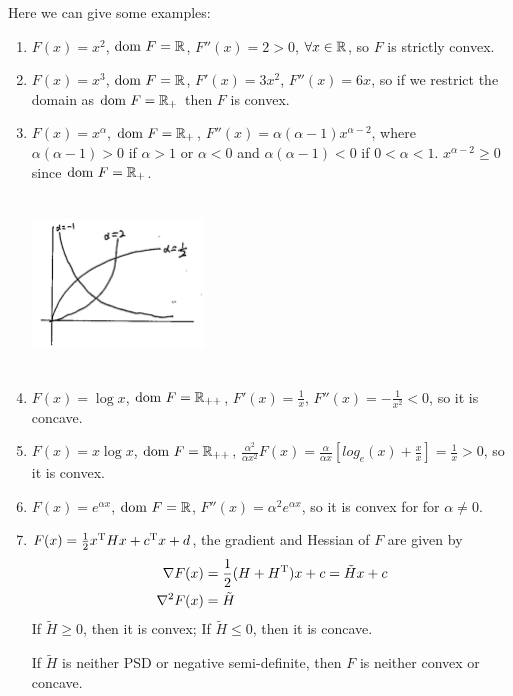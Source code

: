 Here we can give some examples:

\begin{enumerate}
	\item $F(x) = x^2$, $\text{dom}\ F = \mathbb{R}$, $F''(x) = 2 > 0$, $\forall x\in \mathbb{R}$, so $F$ is strictly convex.
	
	\item $F(x) = x^3$, $\text{dom}\ F = \mathbb{R}$, $F'(x) = 3x^2$, $F''(x) = 6x$, so if we restrict the domain as $\text{dom}\ F = \mathbb{R}_+$ then $F$ is convex.
	
	\item $F(x) = x^{\alpha}$, $\text{dom}\ F = \mathbb{R}_+$, $F''(x) = \alpha(\alpha - 1)x^{\alpha - 2}$, where $\alpha(\alpha - 1) > 0$ if $\alpha > 1$ or $\alpha < 0$ and $\alpha(\alpha - 1) < 0$ if $0<\alpha < 1$. $x^{\alpha - 2}\geq 0$ since $\text{dom}\ F = \mathbb{R}_+$.
	
	\begin{marginfigure}
	\centering
	\includegraphics[width=1.8in,height=1.8in]{figures/ch08/figure1106_4.png}
	\end{marginfigure}
	
	\item $F(x) = \log x$, $\text{dom}\ F = \mathbb{R}_{++}$, $F'(x) = \frac{1}{x}$, $F''(x) = -\frac{1}{x^2}<0$, so it is concave.
	
	\item $F(x) = x\log x$, $\text{dom}\ F = \mathbb{R}_{++}$, $\frac{\alpha^2}{\alpha x^2}F(x) = \frac{\alpha}{\alpha x}[log_e(x) + \frac{x}{x}] = \frac{1}{x} > 0$, so it is convex.
	
	\item $F(x) = e^{\alpha x}$, $\text{dom}\ F = \mathbb{R}$, $F''(x) = \alpha^2 e^{\alpha x}$, so it is convex for for $\alpha\neq 0$.
	
	\item $F(x) = \frac{1}{2}x^{{\rm T}}Hx + c^{{\rm T}}x + d$, the gradient and Hessian of $F$ are given by
	\begin{align*}
	\nabla F(x) &= \frac{1}{2}(H+H^{{\rm T}})x + c = \tilde{H}x + c\\
	\nabla^2F(x) &= \tilde{H}
	\end{align*}
	If $\tilde{H}\geq 0$, then it is convex; If $\tilde{H}\leq 0$, then it is concave.
	
	If $\tilde{H}$ is neither PSD or negative semi-definite, then $F$ is neither convex or concave.
\end{enumerate}

